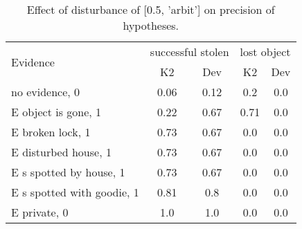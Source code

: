 \begin{table}\begin{tabular}{l|cc|cc}\toprule\multirow{2}{*}{Evidence} & \multicolumn{2}{c}{successful stolen}& \multicolumn{2}{c}{lost object}\\& {K2} & {Dev}& {K2} & {Dev}\\\midrule
no evidence, 0 & \cellcolor{Bittersweet}0.06&\cellcolor{Bittersweet}0.12&\cellcolor{Bittersweet}0.2&\cellcolor{Bittersweet}0.0\\E object is gone, 1 & \cellcolor{Bittersweet}0.22&\cellcolor{Bittersweet}0.67&\cellcolor{Bittersweet}0.71&\cellcolor{Bittersweet}0.0\\E broken lock, 1 & \cellcolor{Bittersweet}0.73&\cellcolor{Bittersweet}0.67&0.0&0.0\\E disturbed house, 1 & \cellcolor{Bittersweet}0.73&\cellcolor{Bittersweet}0.67&0.0&0.0\\E s spotted by house, 1 & \cellcolor{Bittersweet}0.73&\cellcolor{Bittersweet}0.67&0.0&0.0\\E s spotted with goodie, 1 & 0.81&0.8&0.0&0.0\\E private, 0 & 1.0&1.0&0.0&0.0\\\bottomrule\end{tabular}\caption{Effect of disturbance of [0.5, 'arbit'] on precision of hypotheses.}\end{table}
